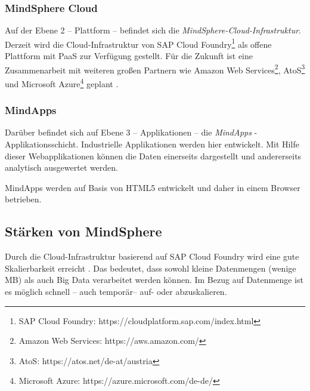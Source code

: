 \subsubsection{MindSphere Cloud}
Auf der Ebene 2 -- Plattform -- befindet sich die \textit{MindSphere-Cloud-Infrastruktur}. Derzeit wird die Cloud-Infrastruktur von SAP Cloud Foundry\footnote{SAP Cloud Foundry: https://cloudplatform.sap.com/index.html} als offene Plattform mit \ac{PaaS} zur Verfügung gestellt. Für die Zukunft ist eine Zusammenarbeit mit weiteren großen Partnern wie Amazon Web Services\footnote{Amazon Web Services: https://aws.amazon.com/}, AtoS\footnote{AtoS: https://atos.net/de-at/austria} und Microsoft Azure\footnote{Microsoft Azure: https://azure.microsoft.com/de-de/} geplant \parencite{SiemensMSIntroduction}. 

\subsubsection{MindApps}
Darüber befindet sich auf Ebene 3 -- Applikationen -- die \textit{MindApps} -Applikationsschicht. Industrielle Applikationen werden hier entwickelt. Mit Hilfe dieser Webapplikationen können die Daten einerseits dargestellt und andererseits analytisch ausgewertet werden. 

MindApps werden auf Basis von HTML5 entwickelt und daher in einem Browser betrieben.

\subsection{Stärken von MindSphere}
Durch die Cloud-Infrastruktur basierend auf SAP Cloud Foundry wird eine gute Skalierbarkeit erreicht \parencite{SiemensMSIntroduction,SiemensWhitepaper}. Das bedeutet, dass sowohl kleine Datenmengen (wenige MB) als auch Big Data verarbeitet werden können. Im Bezug auf Datenmenge ist es möglich schnell -- auch temporär-- auf- oder abzuskalieren. 
\vspace{\baselineskip}

